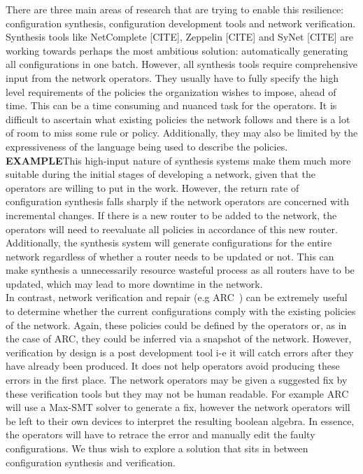 There are three main areas of research that are trying to enable this resilience: configuration synthesis, configuration development tools and network verification. Synthesis tools like NetComplete [CITE], Zeppelin [CITE] and SyNet [CITE] are working towards perhaps the most ambitious solution: automatically generating all configurations in one batch. However, all synthesis tools require comprehensive input from the network operators. They usually have to fully specify the high level requirements of the policies the organization wishes to impose, ahead of time. This can be a time consuming and nuanced task for the operators. It is difficult to ascertain what existing policies the network follows and there is a lot of room to miss some rule or policy. Additionally, they may also be limited by the expressiveness of the language being used to describe the policies. \textbf{EXAMPLE}This high-input nature of synthesis systems make them much more suitable during the initial stages of developing a network, given that the operators are willing to put in the work. However, the return rate of configuration synthesis falls sharply if the network operators are concerned with incremental changes. If there is a new router to be added to the network, the operators will need to reevaluate all policies in accordance of this new router. Additionally, the synthesis system will generate configurations for the entire network regardless of whether a router needs to be updated or not. This can make synthesis a unnecessarily resource wasteful process as all routers have to be updated, which may lead to more downtime in the network.\\ 

In contrast, network verification and repair (e.g ARC~\cite{arc}) can be extremely useful to determine whether the current configurations comply with the existing policies of the network. Again, these policies could be defined by the operators or, as in the case of ARC, they could be inferred via a snapshot of the network. However, verification by design is a post development tool i-e it will catch errors after they have already been produced. It does not help operators avoid producing these errors in the first place. The network operators may be given a suggested fix by these verification tools but they may not be human readable. For example ARC will use a Max-SMT solver to generate a fix, however the network operators will be left to their own devices to interpret the resulting boolean algebra. In essence, the operators will have to retrace the error and manually edit the faulty configurations. We thus wish to explore a solution that sits in between configuration synthesis and verification.\\

